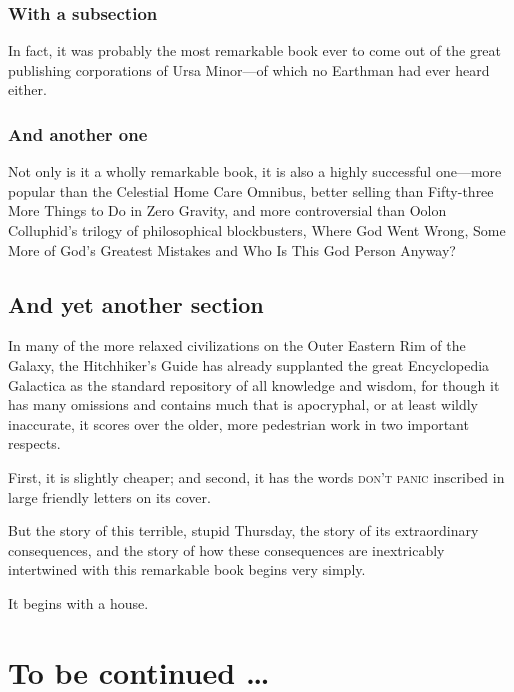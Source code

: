 \documentclass[a4paper, twocolumn, openany]{book}
\begin{document}
	\subsection{With a subsection}
	
	In fact, it was probably the most remarkable book ever to come out of the great publishing corporations of Ursa Minor—of which no Earthman had ever heard either.
	
	\subsection{And another one}
	
	Not only is it a wholly remarkable book, it is also a highly successful one—more popular than the Celestial Home Care Omnibus, better selling than Fifty-three More Things to Do in Zero Gravity, and more controversial than Oolon Colluphid’s trilogy of philosophical blockbusters, Where God Went Wrong, Some More of God’s Greatest Mistakes and Who Is This God Person Anyway?
	
	\section{And yet another section}
	
	In many of the more relaxed civilizations on the Outer Eastern Rim of the Galaxy, the Hitchhiker’s Guide has already supplanted the great Encyclopedia Galactica as the standard repository of all knowledge and wisdom, for though it has many omissions and contains much that is apocryphal, or at least wildly inaccurate, it scores over the older, more pedestrian work in two important respects.
	
	First, it is slightly cheaper; and second, it has the words \textsc{don't panic} inscribed in large friendly letters on its cover.
	
	But the story of this terrible, stupid Thursday, the story of its extraordinary consequences, and the story of how these consequences are inextricably intertwined with this remarkable book begins very simply.
	
	It begins with a house.
	
	\newpage
	
	\chapter*{To be continued \ldots}
		
\end{document}
